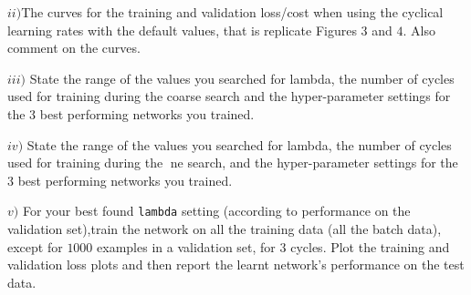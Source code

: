 \documentclass[11pt]{article}
\begin{document}
\begin{tcolorbox}
$ii)$The curves for the training and validation loss/cost when using the cyclical learning rates with the default values, that is replicate Figures $3$ and $4$. Also comment on the curves.
\end{tcolorbox}

\begin{tcolorbox}
$iii)$ State the range of the values you searched for lambda, the number of cycles used for training during the coarse search and the hyper-parameter settings for the 3 best performing networks you
trained.
\end{tcolorbox}

\begin{tcolorbox}
$iv)$ State the range of the values you searched for lambda, the number of cycles used for training during the ne search, and the hyper-parameter settings for the 3 best performing networks you trained.
\end{tcolorbox}
\begin{tcolorbox}
$v)$ For your best found  \texttt{lambda} setting (according to performance on the validation set),train the network on all the training data (all the batch data), except for $1000$ examples in a validation set, for $3$ cycles. Plot the training and validation loss plots and then report the learnt network's performance on the test data.
\end{tcolorbox}
\end{document}
